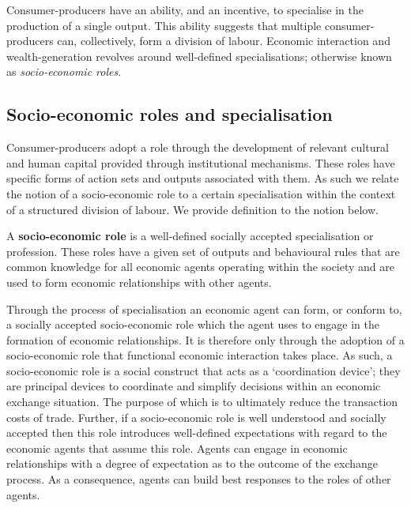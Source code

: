 Consumer-producers have an ability, and an incentive, to specialise in the production of a single output. This ability suggests that multiple consumer-producers can, collectively, form a division of labour. Economic interaction and wealth-generation revolves around well-defined specialisations; otherwise known as \emph{socio-economic roles}.

\subsection{Socio-economic roles and specialisation}
\label{subsec:socio-economic roles}

Consumer-producers adopt a role through the development of relevant cultural and human capital provided through institutional mechanisms. These roles have specific forms of action sets and outputs associated with them. As such we relate the notion of a socio-economic role to a certain specialisation within the context of a structured division of labour. We provide definition to the notion below.
\begin{definition} \label{def:role}
A \textbf{socio-economic role} is a well-defined socially accepted specialisation or profession. These roles have a given set of outputs and behavioural rules that are common knowledge for all economic agents operating within the society and are used to form economic relationships with other agents.
\end{definition}
Through the process of specialisation an economic agent can form, or conform to, a socially accepted socio-economic role which the agent uses to engage in the formation of economic relationships. It is therefore only through the adoption of a socio-economic role that functional economic interaction takes place. As such, a socio-economic role is a social construct that acts as a `coordination device'; they are principal devices to coordinate and simplify decisions within an economic exchange situation. The purpose of which is to ultimately reduce the transaction costs of trade. Further, if a socio-economic role is well understood and socially accepted then this role introduces well-defined expectations with regard to the economic agents that assume this role. Agents can engage in economic relationships with a degree of expectation as to the outcome of the exchange process. As a consequence, agents can build best responses to the roles of other agents.

